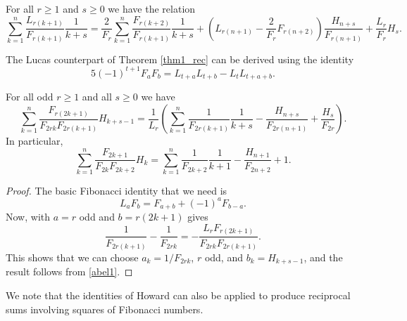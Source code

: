 \documentclass[12pt,reqno]{article}
\begin{document}
	\begin{corollary}
		For all $r\geq 1$ and $s\geq 0$ we have the relation
		\begin{equation}
			\sum_{k=1}^n \frac{L_{r(k+1)}}{F_{r(k+1)}}\frac{1}{k+s} = \frac{2}{F_r} \sum_{k=1}^n \frac{F_{r(k+2)}}{F_{r(k+1)}}\frac{1}{k+s}
			+ \left (L_{r(n+1)} - \frac{2}{F_r} F_{r(n+2)} \right ) \frac{H_{n+s}}{F_{r(n+1)}} + \frac{L_r}{F_r} H_s.
		\end{equation}
	\end{corollary}
	
	\begin{remark}
		The Lucas counterpart of Theorem \ref{thm1_rec} can be derived using the identity
		\begin{equation*}
			5 (-1)^{t+1} F_a F_b = L_{t+a}L_{t+b} - L_t L_{t+a+b}.
		\end{equation*}
	\end{remark}
	
	\begin{theorem}\label{thm3_rec}
		For all odd $r\geq 1$ and all $s\geq 0$ we have
		\begin{equation}\label{eq1_thm3_rec}
			\sum_{k=1}^n \frac{F_{r(2k+1)}}{F_{2rk} F_{2r(k+1)}} H_{k+s-1} = \frac{1}{L_r} \left ( \sum_{k=1}^n \frac{1}{F_{2r(k+1)}}\frac{1}{k+s}
			- \frac{H_{n+s}}{F_{2r(n+1)}}  + \frac{H_s}{F_{2r}} \right ).
		\end{equation}
		In particular,
		\begin{equation}
			\sum_{k=1}^n \frac{F_{2k+1}}{F_{2k} F_{2k+2}} H_{k} = \sum_{k=1}^n \frac{1}{F_{2k+2}}\frac{1}{k+1} - \frac{H_{n+1}}{F_{2n+2}} +1.
		\end{equation}
	\end{theorem}
	\begin{proof}
		The basic Fibonacci identity that we need is
		\begin{equation*}
			L_a F_b = F_{a+b} + (-1)^a F_{b-a}.
		\end{equation*}
		Now, with $a=r$ odd and $b=r(2k+1)$ gives
		\begin{equation*}
			\frac{1}{F_{2r(k+1)}} - \frac{1}{F_{2rk}} = - \frac{L_r F_{r(2k+1)}}{F_{2rk} F_{2r(k+1)}}.
		\end{equation*}
		This shows that we can choose $a_k=1/F_{2rk}$, $r$ odd, and $b_k=H_{k+s-1}$, and the result follows from \eqref{abel1}.
	\end{proof}
	
	We note that the identities of Howard can also be applied to produce reciprocal sums involving squares of Fibonacci numbers.
	
\end{document}
